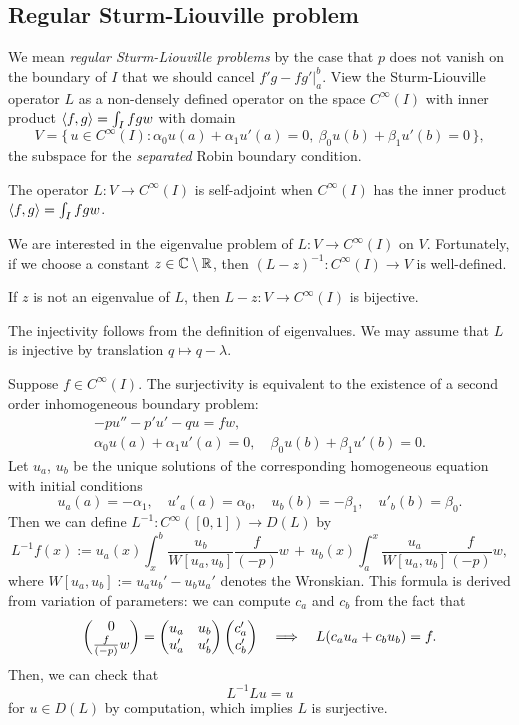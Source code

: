 \documentclass[12pt]{article}
\begin{document}
\subsection{Regular Sturm-Liouville problem}
We mean \emph{regular Sturm-Liouville problems} by the case that $p$ does not vanish on the boundary of $I$ that we should cancel $f'g-fg'|_a^b$.
View the Sturm-Liouville operator $L$ as a non-densely defined operator on the space $C^\infty(I)$ with inner product $\langle f,g\rangle=\int_Ifgw$ with domain
\[V=\{\,u\in C^\infty(I):\alpha_0u(a)+\alpha_1u'(a)=0,\ \beta_0u(b)+\beta_1u'(b)=0\,\},\]
the subspace for the \emph{separated} Robin boundary condition.
\begin{prop}
The operator $L:V\to C^\infty(I)$ is self-adjoint when $C^\infty(I)$ has the inner product $\langle f,g\rangle=\int_Ifgw$.
\end{prop}
We are interested in the eigenvalue problem of $L:V\to C^\infty(I)$ on $V$.
Fortunately, if we choose a constant $z\in\mathbb{C}\setminus\mathbb{R}$, then $(L-z)^{-1}:C^\infty(I)\to V$ is well-defined.
\begin{prop}
If $z$ is not an eigenvalue of $L$, then $L-z:V\to C^\infty(I)$ is bijective.
\end{prop}
\begin{pf}
The injectivity follows from the definition of eigenvalues.
We may assume that $L$ is injective by translation $q\mapsto q-\lambda$.

Suppose $f\in C^\infty(I)$.
The surjectivity is equivalent to the existence of a second order inhomogeneous boundary problem:
\begin{gather*}
-pu''-p'u'-qu=fw,\\
\alpha_0u(a)+\alpha_1u'(a)=0,\quad\beta_0u(b)+\beta_1u'(b)=0.
\end{gather*}
Let $u_a$, $u_b$ be the unique solutions of the corresponding homogeneous equation with initial conditions
\[u_a(a)=-\alpha_1,\quad u'_a(a)=\alpha_0,\quad u_b(b)=-\beta_1,\quad u'_b(b)=\beta_0.\]
Then we can define $L^{-1}:C^\infty([0,1])\to D(L)$ by
\[L^{-1}f(x):=u_a(x)\int_x^b\frac{u_b}{W[u_a,u_b]}\frac f{(-p)}w\,+\,u_b(x)\int_a^x\frac{u_a}{W[u_a,u_b]}\frac f{(-p)}w,\]
where $W[u_a,u_b]:=u_au_b'-u_bu_a'$ denotes the Wronskian.
This formula is derived from variation of parameters: we can compute $c_a$ and $c_b$ from the fact that
\[\begin{pmatrix}0\\\frac f{(-p)}w\end{pmatrix}=\begin{pmatrix}u_a&u_b\\u_a'&u_b'\end{pmatrix}\begin{pmatrix}c_a'\\c_b'\end{pmatrix}\impl L(c_au_a+c_bu_b)=f.\]
Then, we can check that
\[L^{-1}Lu=u\]
for $u\in D(L)$ by computation, which implies $L$ is surjective.
\end{pf}
\end{document}
